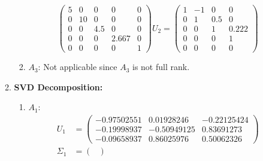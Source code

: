 \documentclass[conference,onecolumn]{IEEEtran}
\begin{document}
\begin{enumerate}[label=\arabic{enumi}.]
\begin{enumerate}
\begin{enumerate}
$$                                  \begin{pmatrix}
                                      5 & 0  & 0   & 0     & 0 \\
                                      0 & 10 & 0   & 0     & 0 \\
                                      0 & 0  & 4.5 & 0     & 0 \\
                                      0 & 0  & 0   & 2.667 & 0 \\
                                      0 & 0  & 0   & 0     & 1
                                  \end{pmatrix}
                                  U_2 =
                                  \begin{pmatrix}
                                      1 & -1 & 0   & 0     \\
                                      0 & 1  & 0.5 & 0     \\
                                      0 & 0  & 1   & 0.222 \\
                                      0 & 0  & 0   & 1     \\
                                      0 & 0  & 0   & 0
                                  \end{pmatrix}
                              $$
                        \item $A_3$: Not applicable since $A_3$ is not full rank.
                    \end{enumerate}
              \item \textbf{SVD Decomposition:}
                    \begin{enumerate}
                        \item $A_1$:
                              \begin{align*}
                                  U_1      & =
                                  \begin{pmatrix}
                                      -0.97502551 & 0.01928246  & -0.22125424 \\
                                      -0.19998937 & -0.50949125 & 0.83691273  \\
                                      -0.09658937 & 0.86025976  & 0.50062326
                                  \end{pmatrix} \\
                                  \Sigma_1 & =
                                  \begin{pmatrix}

\end{pmatrix}
\end{align*}
\end{enumerate}
\end{enumerate}
\end{enumerate}
\end{document}
